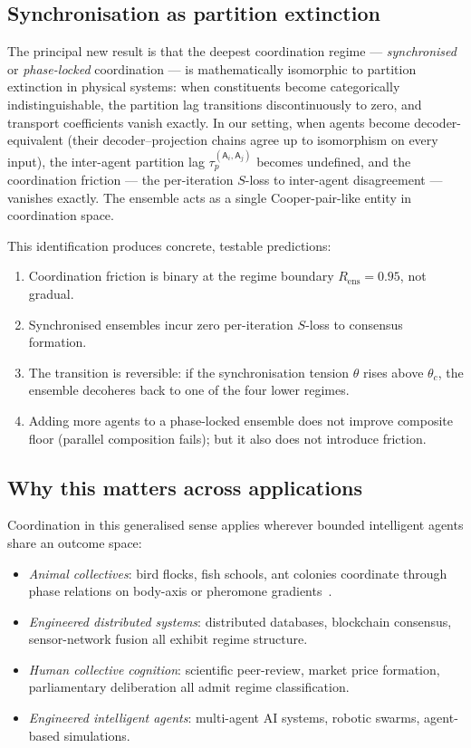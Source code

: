 \documentclass[11pt,twocolumn,a4paper]{article}
\newcommand{\agent}{\mathsf{A}}
\newcommand{\tauP}{\tau_p}
\begin{document}
\subsection{Synchronisation as partition extinction}

The principal new result is that the deepest coordination regime ---
\emph{synchronised} or \emph{phase-locked} coordination --- is
mathematically isomorphic to partition extinction in physical systems:
when constituents become categorically indistinguishable, the partition
lag transitions discontinuously to zero, and transport coefficients
vanish exactly. In our setting, when agents become decoder-equivalent
(their decoder--projection chains agree up to isomorphism on every
input), the inter-agent partition lag $\tauP^{(\agent_i,\agent_j)}$
becomes undefined, and the coordination friction --- the per-iteration
$S$-loss to inter-agent disagreement --- vanishes exactly. The
ensemble acts as a single Cooper-pair-like entity in coordination
space.

This identification produces concrete, testable predictions:
\begin{enumerate}[label=(\roman*),leftmargin=*]
\item Coordination friction is binary at the regime boundary $R_{\mathrm{ens}}=0.95$, not gradual.
\item Synchronised ensembles incur zero per-iteration $S$-loss to consensus formation.
\item The transition is reversible: if the synchronisation tension $\theta$ rises above $\theta_c$, the ensemble decoheres back to one of the four lower regimes.
\item Adding more agents to a phase-locked ensemble does not improve composite floor (parallel composition fails); but it also does not introduce friction.
\end{enumerate}

\subsection{Why this matters across applications}

Coordination in this generalised sense applies wherever bounded
intelligent agents share an outcome space:
\begin{itemize}[leftmargin=*]
\item \emph{Animal collectives}: bird flocks, fish schools, ant colonies coordinate through phase relations on body-axis or pheromone gradients~\cite{vicsek1995,couzin2002,strogatz2003}.
\item \emph{Engineered distributed systems}: distributed databases, blockchain consensus, sensor-network fusion all exhibit regime structure.
\item \emph{Human collective cognition}: scientific peer-review, market price formation, parliamentary deliberation all admit regime classification.
\item \emph{Engineered intelligent agents}: multi-agent AI systems, robotic swarms, agent-based simulations.
\end{itemize}
\end{document}
